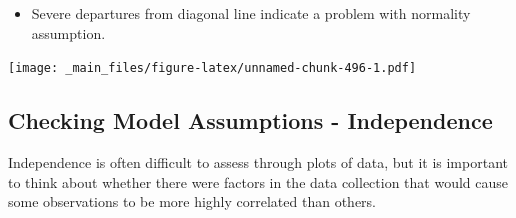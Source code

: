 \documentclass[]{book}
\newenvironment{Shaded}{\begin{snugshade}}{\end{snugshade}}
\newcommand{\KeywordTok}[1]{\textcolor[rgb]{0.13,0.29,0.53}{\textbf{#1}}}
\newcommand{\DataTypeTok}[1]{\textcolor[rgb]{0.13,0.29,0.53}{#1}}
\newcommand{\DecValTok}[1]{\textcolor[rgb]{0.00,0.00,0.81}{#1}}
\newcommand{\StringTok}[1]{\textcolor[rgb]{0.31,0.60,0.02}{#1}}
\newcommand{\OperatorTok}[1]{\textcolor[rgb]{0.81,0.36,0.00}{\textbf{#1}}}
\newcommand{\NormalTok}[1]{#1}
\providecommand{\tightlist}{%
  \setlength{\itemsep}{0pt}\setlength{\parskip}{0pt}}
\begin{document}
\begin{itemize}
\tightlist
\item
  Severe departures from diagonal line indicate a problem with normality
  assumption.
\end{itemize}

\begin{Shaded}
\end{Shaded}

\texttt{[image: \_main\_files/figure-latex/unnamed-chunk-496-1.pdf]}

\subsection{Checking Model Assumptions -
Independence}\label{checking-model-assumptions---independence}

Independence is often difficult to assess through plots of data, but it
is important to think about whether there were factors in the data
collection that would cause some observations to be more highly
correlated than others.
\end{document}
